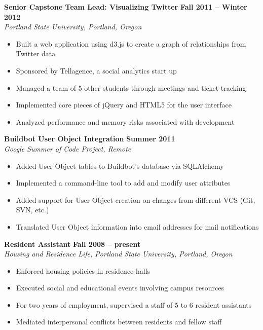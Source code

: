 \documentclass[margin,line]{resume}
\begin{document}
\begin{resume}
    \textbf{Senior Capstone Team Lead: Visualizing Twitter} \hfill \textbf{Fall 2011 -- Winter 2012} \vspace{2mm}\\\vspace{1mm}%
    \textsl{Portland State University, Portland, Oregon}
    \begin{itemize}
        \item Built a web application using d3.js to create a graph of relationships from Twitter data
        \item Sponsored by Tellagence, a social analytics start up
        \item Managed a team of 5 other students through meetings and ticket tracking
        \item Implemented core pieces of jQuery and HTML5 for the user interface
        \item Analyzed performance and memory risks associated with development
    \end{itemize}

    \textbf{Buildbot User Object Integration} \hfill \textbf{Summer 2011} \vspace{2mm}\\\vspace{1mm}%
    \textsl{Google Summer of Code Project, Remote}
    \begin{itemize}
        \item Added User Object tables to Buildbot's database via SQLAlchemy
        \item Implemented a command-line tool to add and modify user attributes
        \item Added support for User Object creation on changes from different VCS (Git, SVN, etc.)
        \item Translated User Object information into email addresses for mail notifications
    \end{itemize}

    \textbf{Resident Assistant} \hfill \textbf{Fall 2008 -- present} \vspace{2mm}\\\vspace{1mm}%
    \textsl{Housing and Residence Life, Portland State University, Portland, Oregon}
    \begin{itemize}
        \item Enforced housing policies in residence halls
        \item Executed social and educational events involving campus resources
        \item For two years of employment, supervised a staff of 5 to 6 resident assistants
        \item Mediated interpersonal conflicts between residents and fellow staff
    \end{itemize}


\end{resume}
\end{document}

